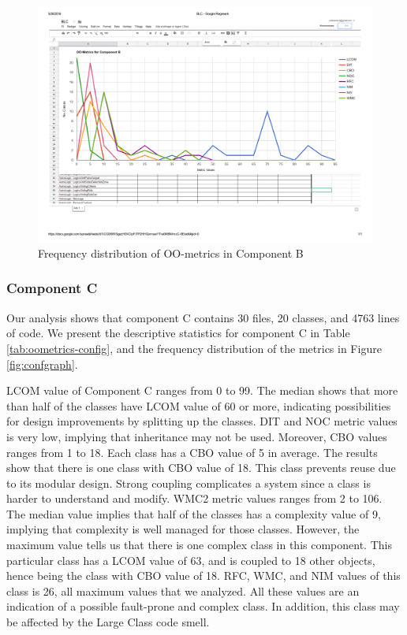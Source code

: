 \begin{landscape}
\setlength\LTleft{-.5in}
	\begin{figure}
	\centering
	\includegraphics[width=\textwidth]{images/blc.pdf}
	\caption{Frequency distribution of OO-metrics in Component B}
	\label{fig:blcgraph}
	\end{figure}
\end{landscape}



\subsubsection{Component C}
Our analysis shows that component C contains 30 files, 20 classes, and 4763 lines of code. We present the descriptive statistics for component C in Table \ref{tab:oometrics-config}, and the frequency distribution of the metrics in Figure \ref{fig:confgraph}.

LCOM value of Component C ranges from 0 to 99. The median shows that more than half of the classes have LCOM value of 60 or more, indicating possibilities for design improvements by splitting up the classes. DIT and NOC metric values is very low, implying that inheritance may not be used. Moreover, CBO values ranges from 1 to 18. Each class has a CBO value of 5 in average. The results show that there is one class with CBO value of 18. This class prevents reuse due to its modular design. Strong coupling complicates a system since a class is harder to understand and modify. WMC2 metric values ranges from 2 to 106. The median value implies that half of the classes has a complexity value of 9, implying that complexity is well managed for those classes. However, the maximum value tells us that there is one complex class in this component. This particular class has a LCOM value of 63, and is coupled to 18 other objects, hence being the class with CBO value of 18. RFC, WMC, and NIM values of this class is 26, all maximum values that we analyzed. All these values are an indication of a possible fault-prone and complex class. In addition, this class may be affected by the Large Class code smell.


